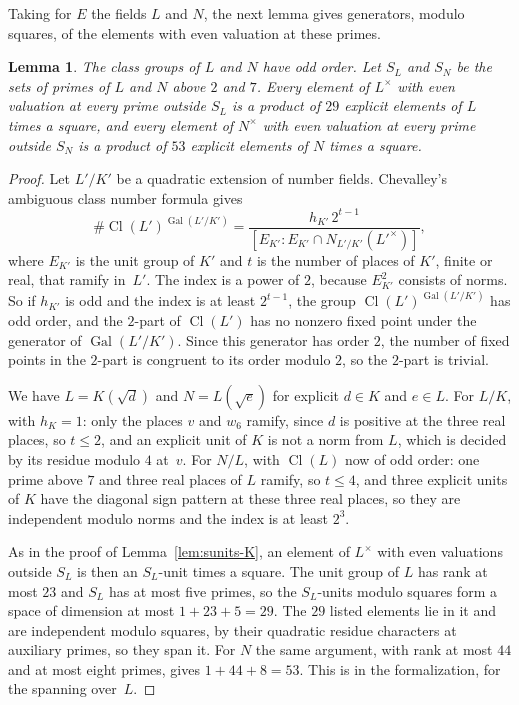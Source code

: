 \documentclass[11pt]{amsart}
\newtheorem{lemma}[theorem]{Lemma}
\theoremstyle{definition}
\numberwithin{equation}{section}
\newcommand{\Gal}{\operatorname{Gal}}
\newcommand{\Cl}{\operatorname{Cl}}
\newcommand{\lean}[1]{\ignorespaces}
\begin{document}
Taking for $E$ the fields $L$ and $N$, the next lemma gives generators, modulo squares, of the elements with even valuation at these primes.

\begin{lemma}\label{lem:sunit-span}\lean{FurioLombardo.Discharge.SelmerBasis.sUnitSpan_L42, FurioLombardo.Discharge.SelmerBasis.sUnitSpan_N84, FurioLombardo.Discharge.SelmerBasis.clTwo_L42, FurioLombardo.Discharge.SelmerBasis.clTwo_N84}
The class groups of $L$ and $N$ have odd order. Let $S_L$ and $S_N$ be the sets of primes of $L$ and $N$ above $2$ and $7$. Every element of $L^\times$ with even valuation at every prime outside $S_L$ is a product of $29$ explicit elements of $L$ times a square, and every element of $N^\times$ with even valuation at every prime outside $S_N$ is a product of $53$ explicit elements of $N$ times a square.
\end{lemma}

\begin{proof}
Let $L'/K'$ be a quadratic extension of number fields. Chevalley's ambiguous class number formula \cite[p.~406]{Chevalley33} gives
\[
\#\Cl(L')^{\Gal(L'/K')}=\frac{h_{K'}\,2^{t-1}}{[E_{K'}:E_{K'}\cap N_{L'/K'}(L'^\times)]},
\]
where $E_{K'}$ is the unit group of $K'$ and $t$ is the number of places of $K'$, finite or real, that ramify in~$L'$. The index is a power of $2$, because $E_{K'}^2$ consists of norms. So if $h_{K'}$ is odd and the index is at least $2^{t-1}$, the group $\Cl(L')^{\Gal(L'/K')}$ has odd order, and the $2$-part of $\Cl(L')$ has no nonzero fixed point under the generator of $\Gal(L'/K')$. Since this generator has order $2$, the number of fixed points in the $2$-part is congruent to its order modulo $2$, so the $2$-part is trivial.

We have $L=K(\sqrt d)$ and $N=L(\sqrt e)$ for explicit $d\in K$ and $e\in L$. For $L/K$, with $h_K=1$: only the places $v$ and $w_6$ ramify, since $d$ is positive at the three real places, so $t\le2$, and an explicit unit of $K$ is not a norm from $L$, which is decided by its residue modulo $4$ at~$v$. For $N/L$, with $\Cl(L)$ now of odd order: one prime above $7$ and three real places of $L$ ramify, so $t\le4$, and three explicit units of $K$ have the diagonal sign pattern at these three real places, so they are independent modulo norms and the index is at least $2^3$.

As in the proof of Lemma~\ref{lem:sunits-K}, an element of $L^\times$ with even valuations outside $S_L$ is then an $S_L$-unit times a square. The unit group of $L$ has rank at most $23$ and $S_L$ has at most five primes, so the $S_L$-units modulo squares form a space of dimension at most $1+23+5=29$. The $29$ listed elements lie in it and are independent modulo squares, by their quadratic residue characters at auxiliary primes, so they span it. For $N$ the same argument, with rank at most $44$ and at most eight primes, gives $1+44+8=53$. This is  in the formalization, for the spanning over~$L$.
\end{proof}
\end{document}
